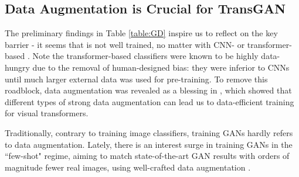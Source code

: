 \documentclass{article}
\begin{document}
\begin{table}[h]
\vspace{-1em}
\caption{Inception Score (IS) and FID results on CIFAR-10. The first row shows the AutoGAN results \cite{gong2019autogan}; the second and thirds row show the mixed transformer-CNN results; and the last row shows the pure-transformer GAN results.}
\vspace{-0.5em}
\label{table:GD}
\begin{center}
\begin{sc}
\end{sc}
\end{center}
\vspace{-0.5em}
\end{table}







\subsection{Data Augmentation is Crucial for TransGAN}

The preliminary findings in Table \ref{table:GD} inspire us to reflect on the key barrier - it seems that  is not well trained, no matter with CNN- or transformer-based . Note the transformer-based classifiers were known to be highly data-hungry \cite{dosovitskiy2020image} due to the removal of human-designed bias: they were inferior to CNNs until much larger external data was used for pre-training. To remove this roadblock, data augmentation was revealed as a blessing in \cite{touvron2020training}, which showed that different types of strong data augmentation can lead us to data-efficient training for visual transformers. 

Traditionally, contrary to training image classifiers, training GANs hardly refers to data augmentation. Lately, there is an interest surge in training GANs in the ``few-shot" regime, aiming to match state-of-the-art GAN results with orders of magnitude fewer real images, using well-crafted data augmentation \cite{zhao2020differentiable,karras2020training}. 
\end{document}
